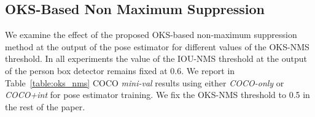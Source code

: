 \documentclass[10pt,twocolumn,letterpaper]{article}
\begin{document}
\subsection{OKS-Based Non Maximum Suppression}

We examine the effect of the proposed OKS-based non-maximum suppression method at the output of the pose estimator for different values of the OKS-NMS threshold. In all experiments the value of the IOU-NMS threshold at the output of the person box detector remains fixed at 0.6. We report in Table~\ref{table:oks_nms} COCO \emph{mini-val} results using either \emph{COCO-only} or \emph{COCO+int} for pose estimator training. We fix the OKS-NMS threshold to 0.5 in the rest of the paper.

\begin{table}
\centering
\caption{Performance (AP) on COCO keypoint \emph{mini-val} with varying values for the OKS-NMS threshold. The pose estimator has been trained with either \emph{COCO-only} or \emph{COCO+int} data.}
\label{table:oks_nms}
\end{table}
\end{document}
